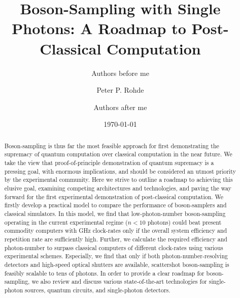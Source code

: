 \documentclass[aps,rmp,twocolumn,amsmath,amssymb,nofootinbib,superscriptaddress]{revtex4}
\begin{document}


%
%

\title{Boson-Sampling with Single Photons: A Roadmap to Post-Classical Computation}

%
%

\author{Authors before me}

\author{Peter P. Rohde}

\author{Authors after me}

\date{\today}

\frenchspacing

%
%

\begin{abstract}
Boson-sampling is thus far the most feasible approach for first demonstrating the supremacy of quantum computation over classical computation in the near future. We take the view that proof-of-principle demonstration of quantum supremacy is a pressing goal, with enormous implications, and should be considered an utmost priority by the experimental community. Here we strive to outline a roadmap to achieving this elusive goal, examining competing architectures and technologies, and paving the way forward for the first experimental demonstration of post-classical computation. We firstly develop a practical model to compare the performance of boson-samplers and classical simulators. In this model, we find that low-photon-number boson-sampling operating in the current experimental regime (\mbox{$n<10$} photons) could beat present commodity computers with GHz clock-rates only if the overall system efficiency and repetition rate are sufficiently high. Further, we calculate the required efficiency and photon-number to surpass classical computers of different clock-rates using various experimental schemes. Especially, we find that only if both photon-number-resolving detectors and high-speed optical shutters are available, scattershot boson-sampling is feasibly scalable to tens of photons. In order to provide a clear roadmap for boson-sampling, we also review and discuss various state-of-the-art technologies for single-photon sources, quantum circuits, and single-photon detectors.
\end{abstract}

\maketitle
\end{document}
